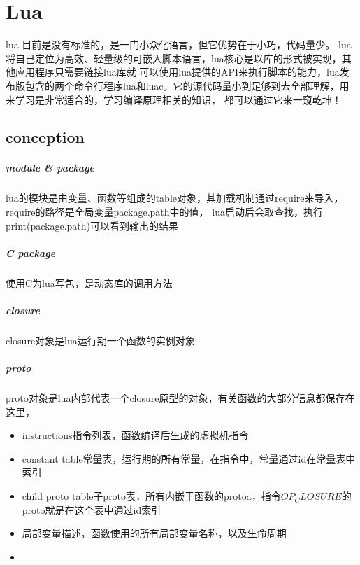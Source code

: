\chapter{Lua}

lua\cite{luaorg} 目前是没有标准的，是一门小众化语言，但它优势在于小巧，代码量少。
lua将自己定位为高效、轻量级的可嵌入脚本语言，lua核心是以库的形式被实现，其他应用程序只需要链接lua库就
可以使用lua提供的API来执行脚本的能力，lua发布版包含的两个命令行程序lua和luac。它的源代码量小到足够到去全部理解，用来学习是非常适合的，学习编译原理相关的知识，
都可以通过它来一窥乾坤！

\section{conception}

\paragraph{module \& package}
lua的模块是由变量、函数等组成的table对象，其加载机制通过require来导入，require的路径是全局变量package.path中的值，
lua启动后会取查找，执行print(package.path)可以看到输出的结果

\paragraph{C package}
使用C为lua写包，是动态库的调用方法

\paragraph{closure}
closure对象是lua运行期一个函数的实例对象

\paragraph{proto}
proto对象是lua内部代表一个closure原型的对象，有关函数的大部分信息都保存在这里，

\begin{itemize}
    \item {instructions指令列表，函数编译后生成的虚拟机指令}
    \item {constant table常量表，运行期的所有常量，在指令中，常量通过id在常量表中索引}
    \item {child proto table子proto表，所有内嵌于函数的protoa，指令$OP_CLOSURE$的proto就是在这个表中通过id索引}
    \item {局部变量描述，函数使用的所有局部变量名称，以及生命周期}
    \item {}
\end{itemize}




